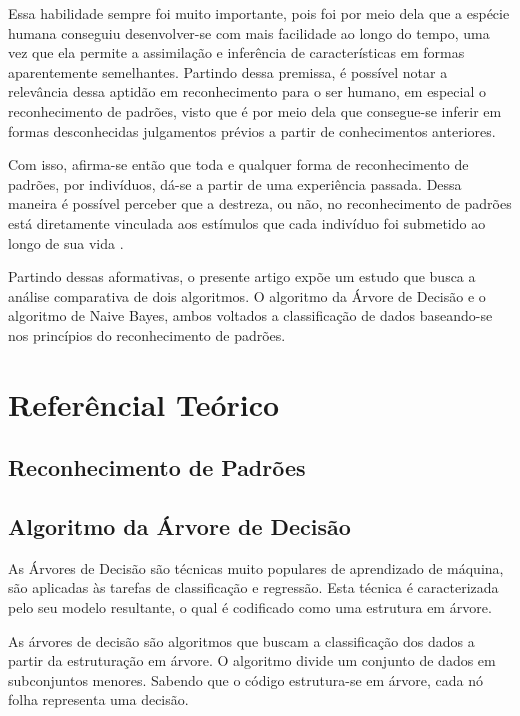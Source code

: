 \documentclass[preprint,12pt]{elsarticle}
\begin{document}
	Essa habilidade sempre foi muito importante, pois foi por meio dela que a esp\'ecie humana conseguiu desenvolver-se com mais facilidade ao longo do tempo, uma vez que ela permite a assimila\c c\~ao e infer\^encia de caracter\'isticas em formas aparentemente semelhantes. Partindo dessa premissa, \'e poss\'ivel notar a relev\^ancia dessa aptid\~ao em reconhecimento para o ser humano, em especial o reconhecimento de padr\~oes, visto que \'e por meio dela que consegue-se inferir em formas desconhecidas julgamentos pr\'evios a partir de conhecimentos anteriores.

	Com isso, afirma-se ent\~ao que toda e qualquer forma de reconhecimento de padr\~oes, por indiv\'iduos, d\'a-se a partir de uma experi\^encia passada. Dessa maneira \'e poss\'ivel perceber que a destreza, ou n\~ao, no reconhecimento de padr\~oes está diretamente vinculada aos est\'imulos que cada indiv\'iduo foi submetido ao longo de sua vida \cite{Prado:2008}.

	Partindo dessas aformativas, o presente artigo exp\~oe um estudo que busca a an\'alise comparativa de dois algoritmos. O algoritmo da \'Arvore de Decis\~ao e o algoritmo de Naive Bayes, ambos voltados a classifica\c c\~ao de dados baseando-se nos princ\'ipios do reconhecimento de padr\~oes.
	\section{Refer\^encial Te\'orico}
	\label{S:2}

	\subsection{Reconhecimento de Padr\~oes}

	\subsection{Algoritmo da \'Arvore de Decis\~ao}

	As  \'Arvores de Decis\~ao s\~ao t\'ecnicas muito populares de aprendizado de m\'aquina, s\~ao aplicadas \`as tarefas de classifica\c c\~ao e regress\~ao. Esta t\'ecnica \'e caracterizada pelo seu modelo resultante, o qual \'e codificado como uma estrutura em \'arvore\cite{Nuti:2019}.

	As \'arvores de decis\~ao s\~ao algoritmos que buscam a classifica\c c\~ao dos dados a partir da estruturação em árvore. O algoritmo divide um conjunto de dados em subconjuntos menores. Sabendo que o c\'odigo estrutura-se em \'arvore, cada n\'o folha representa uma decis\~ao.
\end{document}
